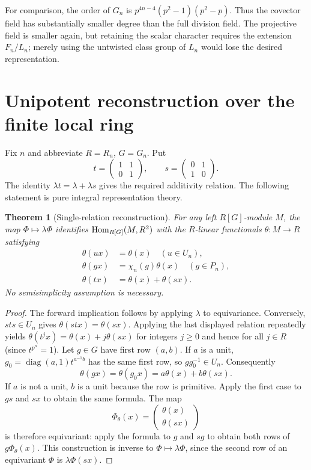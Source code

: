 \documentclass[11pt,a4paper]{article}
\newtheorem{theorem}{Theorem}[section]
\theoremstyle{definition}\newtheorem{definition}[theorem]{Definition}
\theoremstyle{remark}\newtheorem{remark}[theorem]{Remark}
\numberwithin{equation}{section}
\begin{document}
For comparison, the order of $G_n$ is $p^{4n-4}(p^2-1)(p^2-p)$. Thus the covector field has substantially smaller degree than the full division field. The projective field is smaller again, but retaining the scalar character requires the extension $F_n/L_n$; merely using the untwisted class group of $L_n$ would lose the desired representation.
\clearpage
\section{Unipotent reconstruction over the finite local ring}
Fix $n$ and abbreviate $R=R_n$, $G=G_n$. Put
\[
t=\begin{pmatrix}1&1\\0&1\end{pmatrix},\qquad
s=\begin{pmatrix}0&1\\1&0\end{pmatrix}.
\]
The identity $\lambda t=\lambda+\lambda s$ gives the required additivity relation. The following statement is pure integral representation theory.

\begin{theorem}[Single-relation reconstruction]\label{th:unipotent}
For any left $R[G]$-module $M$, the map $\Phi\mapsto\lambda\Phi$ identifies $\operatorname{Hom}_{R[G]}(M,R^2)$ with the $R$-linear functionals $\theta:M\to R$ satisfying
\begin{align}
\theta(ux)&=\theta(x)\quad(u\in U_n),\\
\theta(gx)&=\chi_n(g)\theta(x)\quad(g\in P_n),\\
\theta(tx)&=\theta(x)+\theta(sx).
\end{align}
No semisimplicity assumption is necessary.
\end{theorem}
\begin{proof}
The forward implication follows by applying $\lambda$ to equivariance. Conversely, $sts\in U_n$ gives $\theta(stx)=\theta(sx)$. Applying the last displayed relation repeatedly yields $\theta(t^jx)=\theta(x)+j\theta(sx)$ for integers $j\ge0$ and hence for all $j\in R$ (since $t^{p^n}=1$). Let $g\in G$ have first row $(a,b)$. If $a$ is a unit, $g_0=\operatorname{diag}(a,1)t^{a^{-1}b}$ has the same first row, so $gg_0^{-1}\in U_n$. Consequently
\[
\theta(gx)=\theta(g_0x)=a\theta(x)+b\theta(sx).
\]
If $a$ is not a unit, $b$ is a unit because the row is primitive. Apply the first case to $gs$ and $sx$ to obtain the same formula. The map
\[
\Phi_\theta(x)=\begin{pmatrix}\theta(x)\\\theta(sx)\end{pmatrix}
\]
is therefore equivariant: apply the formula to $g$ and $sg$ to obtain both rows of $g\Phi_\theta(x)$. This construction is inverse to $\Phi\mapsto\lambda\Phi$, since the second row of an equivariant $\Phi$ is $\lambda\Phi(sx)$.\end{proof}
\end{document}
